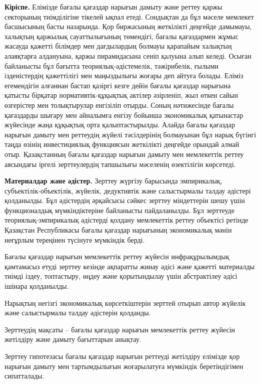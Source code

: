 {\bfseries Кіріспе.} Елімізде бағалы қағаздар нарығын дамыту және реттеу
қаржы секторының тиімділігіне тікелей ықпал етеді. Сондықтан да бұл
мәселе мемлекет басшысының басты назарында. Қор биржасының жеткілікті
деңгейде дамымауы, халықтың қаржылық сауаттылығының төмендігі, бағалы
қағаздармен жұмыс жасауда қажетті білімдер мен дағдылардың болмауы
қарапайым халықтың алаяқтарға алдануына, қаржы пирамидасына сеніп
қалуына алып келеді. Осыған байланысты бұл бағытта
теориялық-әдістемелік, тәжірибелік, ғылыми ізденістердің қажеттілігі мен
маңыздылығы жоғары деп айтуға болады. Еліміз егемендігін алғаннан бастап
қазіргі кезге дейін бағалы қағаздар нарығына қатысты бірқатар
нормативтік-құқықтық актілер әзірленіп, жыл өткен сайын өзгерістер мен
толықтырулар енгізіліп отырды. Соның нәтижесінде бағалы қағаздарды
шығару мен айналымға енгізу бойынша экономикалық қатынастар жүйесінде
жаңа құқықтық орта қалыптастырылды. Алайда бағалы қағаздар нарығын
дамыту мен реттеудің жүйелі тәсілдерінің болмауынан бұл нарық бүгінгі
таңда өзінің инвестициялық функциясын жеткілікті деңгейде орындай алмай
отыр. Қазақстанның бағалы қағаздар нарығын дамыту мен мемлекеттік реттеу
аясындағы іргелі зерттеулердің тапшылығы мәселенің өзектілігін
көрсетеді.

{\bfseries Материалдар және әдістер.} Зерттеу жүргізу барысында
эмпирикалық, субъектілік-объектілік, жүйелік, дедуктивтік және
салыстырмалы талдау әдістері қолданылды. Бұл әдістердің әрқайсысы сәйкес
зерттеу міндеттерін шешу үшін функционалдық мүмкіндіктеріне байланысты
пайдаланылды. Бұл зерттеуде теориялық-эмпирикалық әдістерді қолдану
мемлекеттік реттеу объектісі ретінде Қазақстан Республикасы бағалы
қағаздар нарығының экономикалық мәнін неғұрлым тереңінен түсінуге
мүмкіндік берді.

Бағалы қағаздар нарығын мемлекеттік реттеу жүйесін инфрақұрылымдық
қамтамасыз етуді зерттеу кезінде ақпаратты жинау әдісі және қажетті
материалды тиімді іздеу, топтастыру, өңдеу және қорытындылау үшін
абстрактілеу әдісі ішінара қолданылды.

Нарықтың негізгі экономикалық көрсеткіштерін зерттей отырып автор
жүйелік және салыстырмалы талдау әдістерін қолданды.

Зерттеудің мақсаты -- бағалы қағаздар нарығын мемлекеттік реттеу жүйесін
жетілдіру және дамыту бағыттарын анықтау.

Зерттеу гипотезасы бағалы қағаздар нарығын реттеуді жетілдіру елімізде
қор нарығын дамыту мен тартымдылығын жоғарылатуға мүмкіндік
беретіндігімен сипатталады.

